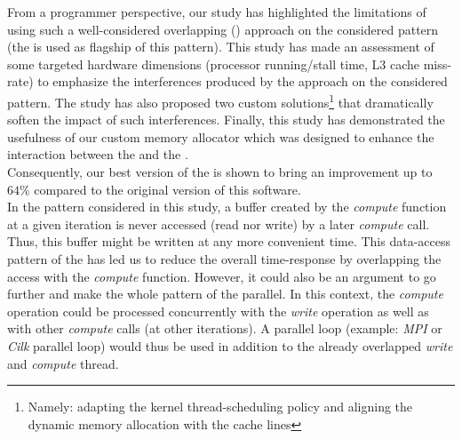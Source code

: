 	From a programmer perspective, our study has highlighted the limitations of using such a well-considered overlapping (\notationaio) approach on the considered pattern (the \toolTargetSoftware\space is used as flagship of this pattern).   This study has made an assessment of some targeted hardware dimensions (processor running/stall time, L3 cache miss-rate) to emphasize the interferences produced by the \notationaio\space approach on the considered pattern.   The study has also proposed two custom solutions\footnote{Namely: adapting the kernel thread-scheduling policy and aligning the dynamic memory allocation with the cache lines} that dramatically soften the impact of such interferences.   Finally, this study has demonstrated the usefulness of our custom memory allocator which was designed to enhance the interaction between the \notationaioComputeThread\space and the \notationaioWriteThreads.\\

	Consequently, our best version of the \toolTargetSoftware\space is shown to bring an improvement up to $64\%$ compared to the original version of this software.\\

	In the pattern considered in this study, a buffer created by the \emph{compute} function at a given iteration is never accessed (read nor write) by a later \emph{compute} call.   Thus, this buffer might be written at any more convenient time.   This data-access pattern of the \toolTargetSoftware\space has led us to reduce the overall time-response by overlapping the \notationIO\space access with the \emph{compute} function.   However, it could also be an argument to go further and make the whole pattern of the \toolTargetSoftware\space parallel.   In this context, the \emph{compute} operation could be processed concurrently with the \emph{write} operation as well as with other \emph{compute} calls (at other iterations).   A parallel loop (example: \emph{MPI} or \emph{Cilk} parallel loop) would thus be used in addition to the already overlapped \emph{write} and \emph{compute} thread.






